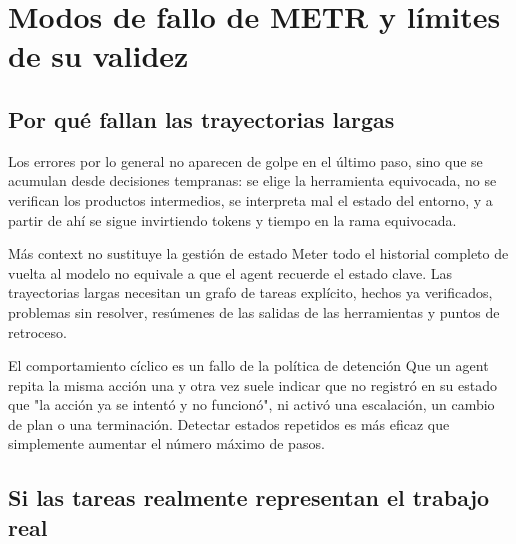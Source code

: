 \section{Modos de fallo de METR y límites de su validez}

\subsection{Por qué fallan las trayectorias largas}


Los errores por lo general no aparecen de golpe en el último paso, sino que se acumulan desde decisiones tempranas: se elige la herramienta equivocada, no se verifican los productos intermedios, se interpreta mal el estado del entorno, y a partir de ahí se sigue invirtiendo tokens y tiempo en la rama equivocada.

\begin{warningbox}{Más context no sustituye la gestión de estado}
Meter todo el historial completo de vuelta al modelo no equivale a que el agent recuerde el estado clave. Las trayectorias largas necesitan un grafo de tareas explícito, hechos ya verificados, problemas sin resolver, resúmenes de las salidas de las herramientas y puntos de retroceso.
\end{warningbox}

\begin{knowledgebox}{El comportamiento cíclico es un fallo de la política de detención}
Que un agent repita la misma acción una y otra vez suele indicar que no registró en su estado que "la acción ya se intentó y no funcionó", ni activó una escalación, un cambio de plan o una terminación. Detectar estados repetidos es más eficaz que simplemente aumentar el número máximo de pasos.
\end{knowledgebox}

\subsection{Si las tareas realmente representan el trabajo real}


